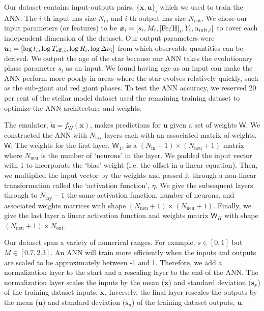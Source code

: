 \documentclass[fleqn,usenatbib]{mnras}
\renewcommand*{\vec}[1]{\boldsymbol{#1}}
\newcommand*{\mat}[1]{\boldsymbol{\mathsf{#1}}}
\newcommand{\inputs}{{x}}
\newcommand{\outputs}{{u}}
\newcommand{\pred}{{\tilde{\outputs}}}
\newcommand{\eep}{\ensuremath{s}}
\newcommand{\feh}{\ensuremath{\mathrm{[Fe/H]}}}
\newcommand{\mlt}[1][]{{\ensuremath{\alpha_{\mathrm{mlt} \ifx#1\empty \else , #1 \fi}}}}
\newcommand{\teff}[1][]{{\ensuremath{T_{\mathrm{eff} \ifx#1\empty \else , #1 \fi}}}}
\begin{document}
Our dataset contains input-outputs pairs, \(\{\vec\inputs, \vec\outputs\}_i\) which we used to train the ANN. The \(i\)-th input has size \(N_\mathrm{in}\) and \(i\)-th output has size \(N_\mathrm{out}\). We chose our input parameters (or features) to be \(\vec\inputs_i = [\eep_i, M_i, \feh_i, Y_i, \mlt[i]]\) to cover each independent dimension of the dataset. Our output parameters were \(\vec\outputs_i = [\log t_i, \log \teff[i], \log R_i, \log \Delta\nu_i]\) from which observable quantities can be derived. We output the age of the star because our ANN takes the evolutionary phase parameter \(\eep_i\) as an input. We found having age as an input can make the ANN perform more poorly in areas where the star evolves relatively quickly, such as the sub-giant and red giant phases. To test the ANN accuracy, we reserved 20 per cent of the stellar model dataset used the remaining training dataset to optimize the ANN architecture and weights.

The emulator, \(\vec\pred = f_{\mathsf{W}}(\vec\inputs)\), makes predictions for \(\vec\outputs\) given a set of weights \(\mat W\). We constructed the ANN with \(N_\mathrm{lay}\) layers each with an associated matrix of weights, \(\mat W\). The weights for the first layer, \(\mat W_1\), is a \((N_\mathrm{in} + 1) \times (N_\mathrm{neu} + 1)\) matrix where \(N_\mathrm{neu}\) is the number of `neurons' in the layer. We padded the input vector with 1 to incorporate the `bias' weight (i.e. the offset in a linear equation). Then, we multiplied the input vector by the weights and passed it through a non-linear transformation called the `activation function', \(\eta\). We give the subsequent layers through to \(N_\mathrm{lay}-1\) the same activation function, number of neurons, and associated weights matrices with shape \((N_\mathrm{neu} + 1) \times (N_\mathrm{neu} + 1)\). Finally, we give the last layer a linear activation function and weights matrix \(\mat W_H\) with shape \((N_\mathrm{neu} + 1) \times N_\mathrm{out}\).

Our dataset span a variety of numerical ranges. For example, \(s \in [0, 1]\) but \(M \in [0.7, 2.3]\). An ANN will train more efficiently when the inputs and outputs are scaled to be approximately between -1 and 1. Therefore, we add a normalization layer to the start and a rescaling layer to the end of the ANN. The normalization layer scales the inputs by the mean (\(\overline{\vec\inputs}\)) and standard deviation (\(\vec s_{\inputs}\)) of the training dataset inputs, \(\vec\inputs\). Inversely, the final layer rescales the outputs by the mean  (\(\overline{\vec\outputs}\)) and standard deviation (\(\vec s_{\outputs}\)) of the training dataset outputs, \(\vec\outputs\).
\end{document}
